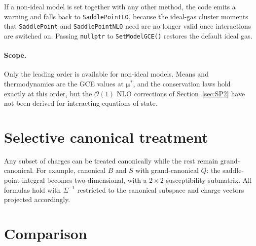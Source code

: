 \documentclass[11pt]{article}
\newcommand{\bmu}{\bm{\mu}}
\begin{document}
If a non-ideal model is set together with any other method, the code emits a warning and falls back to \texttt{SaddlePointLO}, because the ideal-gas cluster moments that \texttt{SaddlePoint} and \texttt{SaddlePointNLO} need are no longer valid once interactions are switched on.
Passing \texttt{nullptr} to \texttt{SetModelGCE()} restores the default ideal gas.

\paragraph{Scope.}
Only the leading order is available for non-ideal models.
Means and thermodynamics are the GCE values at $\bmu^*$, and the conservation laws hold exactly at this order, but the $\mathcal{O}(1)$ NLO corrections of Section~\ref{sec:SP2} have not been derived for interacting equations of state.


\section{Selective canonical treatment}

Any subset of charges can be treated canonically while the rest remain grand-canonical.
For example, canonical $B$ and $S$ with grand-canonical $Q$: the saddle-point integral becomes two-dimensional, with a $2\times2$ susceptibility submatrix.
All formulas hold with $\Sigma^{-1}$ restricted to the canonical subspace and charge vectors projected accordingly.


\section{Comparison}
\label{sec:comparison}
\end{document}
